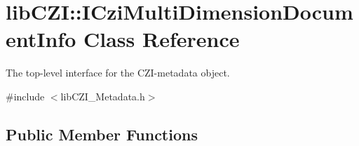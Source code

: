 \hypertarget{classlib_c_z_i_1_1_i_czi_multi_dimension_document_info}{}\section{lib\+C\+ZI\+:\+:I\+Czi\+Multi\+Dimension\+Document\+Info Class Reference}
\label{classlib_c_z_i_1_1_i_czi_multi_dimension_document_info}


The top-\/level interface for the C\+Z\+I-\/metadata object.  




{\ttfamily \#include $<$lib\+C\+Z\+I\+\_\+\+Metadata.\+h$>$}

\subsection*{Public Member Functions}
